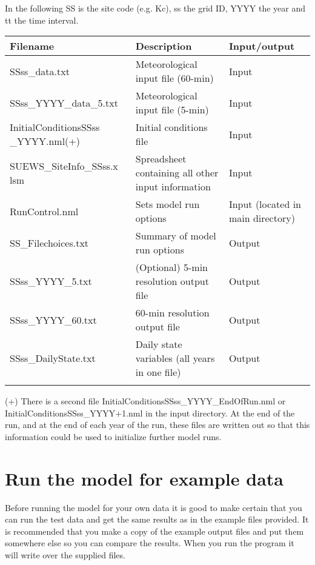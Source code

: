 \documentclass[letterpaper,10pt,english]{sphinxmanual}
\begin{document}
In the following SS is the site code (e.g. Kc), ss the grid ID, YYYY the
year and tt the time interval.


\begin{savenotes}\sphinxattablestart
\centering
\begin{tabulary}{\linewidth}[t]{|T|T|T|}
\hline
\sphinxstyletheadfamily 
Filename
&\sphinxstyletheadfamily 
Description
&\sphinxstyletheadfamily 
Input/output
\\
\hline
SSss\_data.txt
&
Meteorological input
file (60-min)
&
Input
\\
\hline
SSss\_YYYY\_data\_5.txt
&
Meteorological input
file (5-min)
&
Input
\\
\hline
InitialConditionsSSss
\_YYYY.nml(+)
&
Initial conditions
file
&
Input
\\
\hline
SUEWS\_SiteInfo\_SSss.x
lsm
&
Spreadsheet
containing all other
input information
&
Input
\\
\hline
RunControl.nml
&
Sets model run
options
&
Input (located in
main directory)
\\
\hline
SS\_Filechoices.txt
&
Summary of model run
options
&
Output
\\
\hline
SSss\_YYYY\_5.txt
&
(Optional) 5-min
resolution output
file
&
Output
\\
\hline
SSss\_YYYY\_60.txt
&
60-min resolution
output file
&
Output
\\
\hline
SSss\_DailyState.txt
&
Daily state variables
(all years in one
file)
&
Output
\\
\hline&&\\
\hline
\end{tabulary}
\par
\sphinxattableend\end{savenotes}

(+) There is a second file InitialConditionsSSss\_YYYY\_EndOfRun.nml or
InitialConditionsSSss\_YYYY+1.nml in the input directory. At the end of
the run, and at the end of each year of the run, these files are written
out so that this information could be used to initialize further model
runs.


\section{Run the model for example data}
\label{\detokenize{prepare-to-run-the-model:run-the-model-for-example-data}}
Before running the model for your own data it is good to make certain
that you can run the test data and get the same results as in the
example files provided. It is recommended that you make a copy of the
example output files and put them somewhere else so you can compare the
results. When you run the program it will write over the supplied files.
\end{document}
